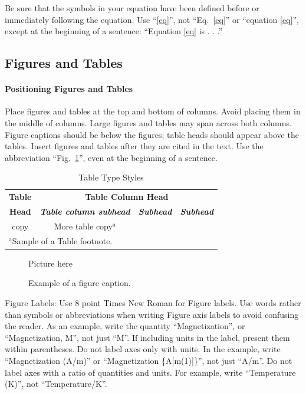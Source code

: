 \documentclass[conference]{IEEEtran}
\begin{document}
Be sure that the 
symbols in your equation have been defined before or immediately following 
the equation. Use ``\eqref{eq}'', not ``Eq.~\eqref{eq}'' or ``equation \eqref{eq}'', except at 
the beginning of a sentence: ``Equation \eqref{eq} is . . .''

\subsection{Figures and Tables}
\paragraph{Positioning Figures and Tables} Place figures and tables at the top and 
bottom of columns. Avoid placing them in the middle of columns. Large 
figures and tables may span across both columns. Figure captions should be 
below the figures; table heads should appear above the tables. Insert 
figures and tables after they are cited in the text. Use the abbreviation 
``Fig.~\ref{fig}'', even at the beginning of a sentence.

\begin{table}[htbp]
\caption{Table Type Styles}
\begin{center}
\begin{tabular}{|c|c|c|c|}
\hline
\textbf{Table}&\multicolumn{3}{|c|}{\textbf{Table Column Head}} \\
\cline{2-4} 
\textbf{Head} & \textbf{\textit{Table column subhead}}& \textbf{\textit{Subhead}}& \textbf{\textit{Subhead}} \\
\hline
copy& More table copy$^{\mathrm{a}}$& &  \\
\hline
\multicolumn{4}{l}{$^{\mathrm{a}}$Sample of a Table footnote.}
\end{tabular}
\label{tab1}
\end{center}
\end{table}

\begin{figure}[htbp]
\centerline{Picture here}
\caption{Example of a figure caption.}
\label{fig}
\end{figure}

Figure Labels: Use 8 point Times New Roman for Figure labels. Use words 
rather than symbols or abbreviations when writing Figure axis labels to 
avoid confusing the reader. As an example, write the quantity 
``Magnetization'', or ``Magnetization, M'', not just ``M''. If including 
units in the label, present them within parentheses. Do not label axes only 
with units. In the example, write ``Magnetization (A/m)'' or ``Magnetization 
\{A[m(1)]\}'', not just ``A/m''. Do not label axes with a ratio of 
quantities and units. For example, write ``Temperature (K)'', not 
``Temperature/K''.
\end{document}
